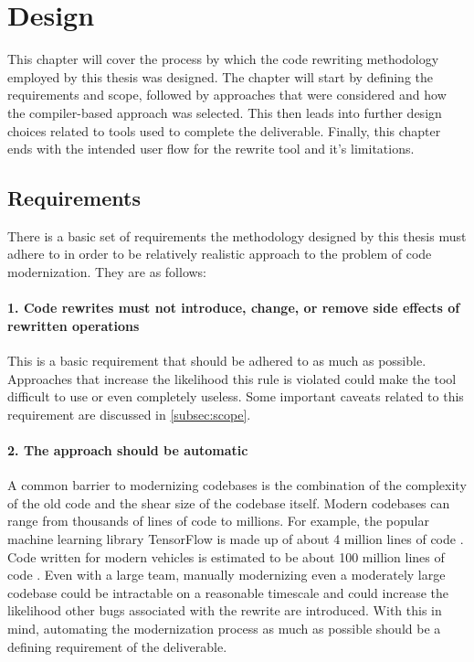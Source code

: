 \chapter{Design}
\label{sec:design}

This chapter will cover the process by which the code rewriting methodology employed by this thesis was designed. The chapter will start by defining the requirements and scope, followed by approaches that were considered and how the compiler-based approach was selected. This then leads into further design choices related to tools used to complete the deliverable. Finally, this chapter ends with the intended user flow for the rewrite tool and it's limitations.

\section{Requirements}

There is a basic set of requirements the methodology designed by this thesis must adhere to in order to be relatively realistic approach to the problem of code modernization. They are as follows:

\subsubsection{1. Code rewrites must not introduce, change, or remove side effects of rewritten operations}

This is a basic requirement that should be adhered to as much as possible. Approaches that increase the likelihood this rule is violated could make the tool difficult to use or even completely useless. Some important caveats related to this requirement are discussed in \ref{subsec:scope}.

\subsubsection{2. The approach should be automatic}

A common barrier to modernizing codebases is the combination of the complexity of the old code and the shear size of the codebase itself. Modern codebases can range from thousands of lines of code to millions. For example, the popular machine learning library TensorFlow is made up of about 4 million lines of code \cite{tf_loc}. Code written for modern vehicles is estimated to be about 100 million lines of code \cite{car_loc}. Even with a large team, manually modernizing even a moderately large codebase could be intractable on a reasonable timescale and could increase the likelihood other bugs associated with the rewrite are introduced. With this in mind, automating the modernization process as much as possible should be a defining requirement of the deliverable.

